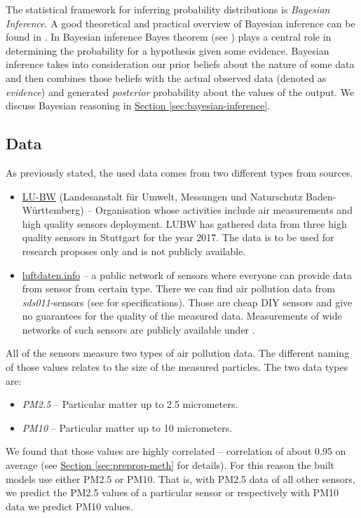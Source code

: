 \documentclass[12pt,a4paper,twoside]{scrartcl}
\numberwithin{equation}{section}
\newcommand{\refsec}[1]{\hyperref[#1]{Section \ref*{#1}}}
\begin{document}
The statistical framework for inferring probability distributions is \emph{Bayesian Inference}. A good theoretical and practical overview of Bayesian inference can be found in \cite{tipping2004}. In Bayesian inference Bayes theorem (see \cite{bayes63}) plays a central role in determining the probability for a hypothesis given some evidence. Bayesian inference takes into consideration our prior beliefs about the nature of some data and then combines those beliefs with the actual observed data (denoted as \emph{evidence}) and generated \emph{posterior} probability about the values of the output. We discuss Bayesian reasoning in \refsec{sec:bayesian-inference}.
\subsection{Data}\label{sec:data}
As previously stated, the used data comes from two different types from sources.
\begin{itemize}
\item \href{https://www.lubw.baden-wuerttemberg.de/startseite}{LU-BW} (Landesanstalt für Umwelt, Messungen und Naturschutz Baden-Württemberg) -- Organisation whose activities include air measurements and high quality sensors deployment. LUBW has gathered data from three high quality sensors in Stuttgart for the year 2017. The data is to be used for research proposes only and is not publicly available.
\item \href{https://luftdaten.info/}{luftdaten.info} -- a public network of sensors where everyone can provide data from sensor from certain type. There we can find air pollution data from \emph{sds011}-sensors (see \cite{sds011}  for specifications). Those are cheap DIY sensors and give no guarantees for the quality of the measured data. Measurements of wide networks of such sensors are publicly available under \cite{datalink}.
\end{itemize}
All of the sensors measure two types of air pollution data. The different naming of those values relates to the size of the measured particles. The two data types are:
\begin{itemize}
\item \emph{PM2.5} -- Particular matter up to 2.5 micrometers.
\item \emph{PM10} -- Particular matter up to 10 micrometers.
\end{itemize}
We found that those values are highly correlated -- correlation of about 0.95 on average (see \refsec{sec:preprop-meth} for details). For this reason the built models use either PM2.5 or PM10. That is, with PM2.5 data of all other sensors, we predict the PM2.5 values of a particular sensor or respectively with PM10 data we predict PM10 values.
\end{document}
